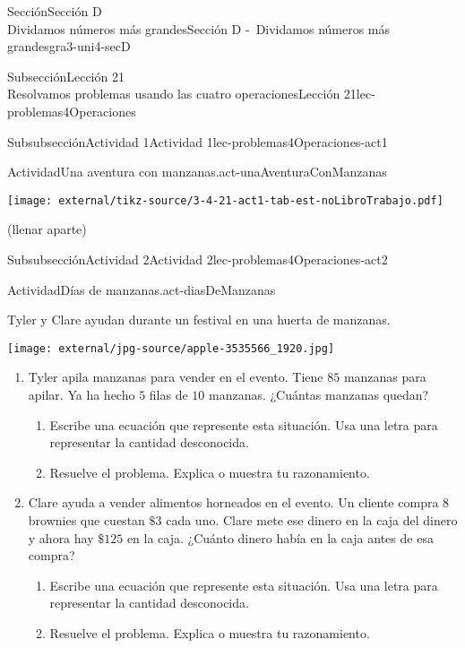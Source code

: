 \begin{sectionptx}{Sección}{{\Large Sección D\\}Dividamos números más grandes}{}{Sección D -~Dividamos números más grandes}{}{}{gra3-uni4-secD}
\begin{subsectionptx}{Subsección}{{\normalsize Lección 21\\[-0.05cm]}Resolvamos problemas usando las cuatro operaciones}{}{Lección 21}{}{}{lec-problemas4Operaciones}
\begin{subsubsectionptx}{Subsubsección}{Actividad 1}{}{Actividad 1}{}{}{lec-problemas4Operaciones-act1}
\begin{activity}{Actividad}{Una aventura con manzanas.}{act-unaAventuraConManzanas}
\begin{image}{0}{1}{0}{}
\texttt{[image: external/tikz-source/3-4-21-act1-tab-est-noLibroTrabajo.pdf]}
\end{image}%
\hfill(llenar aparte)
\end{activity}%
\end{subsubsectionptx}
%
%
\typeout{************************************************}
\typeout{************************************************}
%
\begin{subsubsectionptx}{Subsubsección}{Actividad 2}{}{Actividad 2}{}{}{lec-problemas4Operaciones-act2}
\begin{activity}{Actividad}{Días de manzanas.}{act-diasDeManzanas}%
\begin{sidebyside}{2}{0}{0.05}{0.05}%
\begin{sbspanel}{0.6}%
Tyler y Clare ayudan durante un festival en una huerta de manzanas.%
\end{sbspanel}%
\begin{sbspanel}{0.3}%
\texttt{[image: external/jpg-source/apple-3535566\_1920.jpg]}
\end{sbspanel}%
\end{sidebyside}%
%
\begin{enumerate}
\item{}Tyler apila manzanas para vender en el evento. Tiene \(85\) manzanas para apilar. Ya ha hecho \(5\) filas de \(10\) manzanas. ¿Cuántas manzanas quedan?%
%
\begin{enumerate}
\item{}Escribe una ecuación que represente esta situación. Usa una letra para representar la cantidad desconocida.%
\item{}Resuelve el problema. Explica o muestra tu razonamiento.%
\end{enumerate}
\item{}Clare ayuda a vender alimentos horneados en el evento. Un cliente compra \(8\) brownies que cuestan \(\$3\) cada uno. Clare mete ese dinero en la caja del dinero y ahora hay \(\$125\) en la caja. ¿Cuánto dinero había en la caja antes de esa compra?%
%
\begin{enumerate}
\item{}Escribe una ecuación que represente esta situación. Usa una letra para representar la cantidad desconocida.%
\item{}Resuelve el problema. Explica o muestra tu razonamiento.%
\end{enumerate}

\end{enumerate}
\end{activity}
\end{subsubsectionptx}
\end{subsectionptx}
\end{sectionptx}
